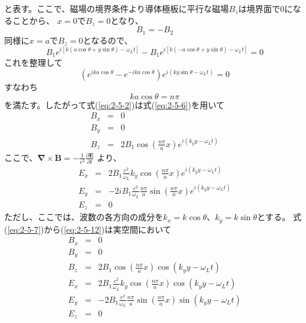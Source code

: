 \documentclass[a4paper,11pt,titlepage]{jsarticle}
\begin{document}
  と表す。ここで、磁場の境界条件より導体極板に平行な磁場$B_z$は境界面で0になることから、
  $x=0$で$B_z=0$となり、
  \begin{equation}
    \label{eq:2-5-3}
    B_1 = - B_2
  \end{equation}
  同様に$x=a$で$B_z=0$となるので、
  \begin{equation}
    \label{eq:2-5-4}
            B_1 e^{i[k(a \cos \theta + y \sin \theta ) - \omega_L t ] }
          - B_1 e^{i[k(-a \cos \theta + y \sin \theta ) - \omega_L t ] }    
          = 0 
  \end{equation}
  これを整理して
  \begin{equation}
    \label{eq:2-5-5}
     \left(  e^{ ika \cos \theta } - e^{ -ika \cos \theta } \right) e^{ i \left( ky \sin \theta - \omega_L t  \right) } 
          = 0 
  \end{equation}
  すなわち
  \begin{equation}
    \label{eq:2-5-6}
     ka \cos \theta = n \pi 
  \end{equation} 
  を満たす。したがって式(\ref{eq:2-5-2})は式(\ref{eq:2-5-6})を用いて
  \begin{eqnarray}
    \label{eq:2-5-7}
    B_x &=& 0  \\
    \label{eq:2-5-8}
    B_y &=& 0 \\
    \label{eq:2-5-9}
    B_z &=&  2 B_1 \cos ( \frac{n \pi}{a} x ) e^{ i \left( k_y y - \omega_L t  \right) }
  \end{eqnarray}
  ここで、$ \bm{\nabla} \times \bm{B} = - \frac{1}{c^2} \frac{\partial \bm{E} }{ \partial t } $ より、
  \begin{eqnarray}
    \label{eq:2-5-10}
    E_x &=& 2 B_1 \frac{c^2}{\omega_L} k_y \cos( \frac{n\pi}{a} x ) e^{ i \left( k_y y  - \omega_L t  \right) }  \\
    \label{eq:2-5-11}
    E_y &=& -2 i B_1  \frac{c^2}{\omega_L} \frac{n\pi}{a} \sin ( \frac{n \pi}{a} x ) e^{ i \left( k_y y - \omega_L t  \right) } \\
    \label{eq:2-5-12}
    E_z &=& 0
  \end{eqnarray}
  ただし、ここでは、波数の各方向の成分を$k_x = k \cos \theta $、$k_y = k \sin \theta $とする。
  式(\ref{eq:2-5-7})から(\ref{eq:2-5-12})は実空間において
  \begin{eqnarray}
    \label{eq:2-5-13}
    B_x &=& 0  \\
    \label{eq:2-5-14}
    B_y &=& 0 \\
    \label{eq:2-5-15}
    B_z &=&  2 B_1 \cos ( \frac{n \pi}{a} x ) \cos \left( k_y y - \omega_L t  \right) \\
    \label{eq:2-5-16}
    E_x &=& 2 B_1 \frac{c^2}{\omega_L} k_y \cos( \frac{n\pi}{a} x ) \cos \left( k_y y - \omega_L t  \right) \\
    \label{eq:2-5-17}
    E_y &=& -2 B_1  \frac{c^2}{\omega_L} \frac{n\pi}{a} \sin ( \frac{n \pi}{a} x ) \sin \left( k_y y - \omega_L t  \right) \\
    \label{eq:2-5-18}
    E_z &=& 0
  \end{eqnarray}
\end{document}
